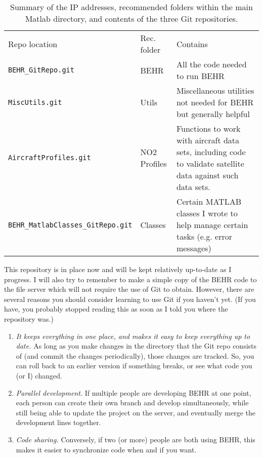 \documentclass[12pt]{article}
\begin{document}
\begin{table}[h]
\begin{tabu} to \textwidth{  X[3,l] | X[1,l] | X[2,l]  } 
	Repo location 		&	Rec. folder 			&	Contains \\ \tabucline[2pt]{-}
	\texttt{BEHR\_GitRepo.git} & BEHR & All the code needed to run BEHR \\ \hline
	\texttt{MiscUtils.git} & Utils & Miscellaneous utilities not needed for BEHR but generally helpful \\ \hline
	\texttt{AircraftProfiles.git} & NO2 Profiles & Functions to work with aircraft data sets, including code to validate satellite data against such data sets. \\ \hline
	\texttt{BEHR\_MatlabClasses\_GitRepo.git} & Classes & Certain MATLAB classes I wrote to help manage certain tasks (e.g. error messages)
\end{tabu}
	\caption{Summary of the IP addresses, recommended folders within the main Matlab directory, and contents of the three Git repositories.}
	\label{GitReposTable}
\end{table}

	This repository is in place now and will be kept relatively up-to-date as I progress.  I will also try to remember to make a simple copy of the BEHR code to the file server which will not require the use of Git to obtain.  However, there are several reasons you should consider learning to use Git if you haven't yet. (If you have, you probably stopped reading this as soon as I told you where the repository was.)
	
	\begin{enumerate}
	 \item \emph{It keeps everything in one place, and makes it easy to keep everything up to date.} As long as you make changes in the directory that the Git repo consists of (and commit the changes periodically), those changes are tracked.  So, you can roll back to an earlier version if something breaks, or see what code you (or I) changed.
	 \item \emph{Parallel development.}  If multiple people are developing BEHR at one point, each person can create their own branch and develop simultaneously, while still being able to update the project on the server, and eventually merge the development lines together.
	 \item \emph{Code sharing.} Conversely, if two (or more) people are both using BEHR, this makes it easier to synchronize code when and if you want.
	\end{enumerate}
	
\end{document}
